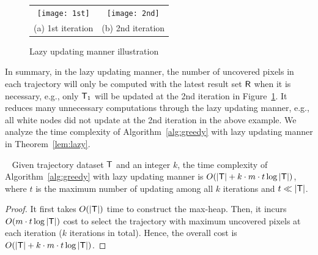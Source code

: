 \begin{figure}
 \centering
 \small
 \begin{tabular}{cc}
   \texttt{[image: 1st]}
   &
   \texttt{[image: 2nd]}
   \\
   (a) 1st iteration
   &
   (b) 2nd iteration
 \end{tabular}
 \caption{Lazy updating manner illustration}
 \label{fig:heap}
\end{figure}

In summary, in the lazy updating manner, the number of uncovered pixels in each trajectory will only be computed with the latest result set $\mathsf{R}$ when it is necessary,
e.g., only $\mathsf{T}_1$ will be updated at the 2nd iteration in Figure~\ref{fig:heap}.
It reduces many unnecessary computations through the lazy updating manner, e.g., all white nodes did not update at the 2nd iteration in the above example.
We analyze the time complexity of Algorithm~\ref{alg:greedy} with lazy updating manner in Theorem~\ref{lem:lazy}.

\begin{lemma}~\label{lem:lazy}
Given trajectory dataset $\mathsf{T}$ and an integer $k$, the time complexity of Algorithm~\ref{alg:greedy} with lazy updating manner is $O(|\mathsf{T}| + k \cdot m \cdot t \log |\mathsf{T}|)$, where $t$ is the maximum number of updating among all $k$ iterations and $t \ll |\mathsf{T}|$.
\end{lemma}

\begin{proof}
It first takes $O(|\mathsf{T}|)$ time to construct the max-heap.
Then, it incurs $O( m \cdot t \log |\mathsf{T}|)$ cost to select the trajectory with maximum uncovered pixels at each iteration ($k$ iterations in total).
Hence, the overall cost is $O(|\mathsf{T}| + k \cdot m \cdot t \log |\mathsf{T}|)$.
\end{proof}


